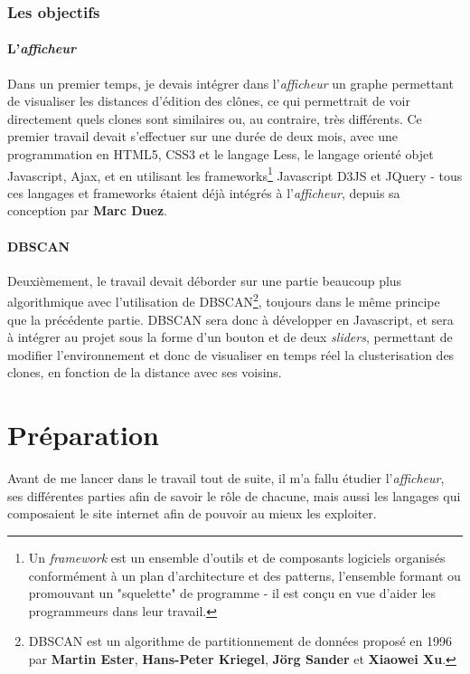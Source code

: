 \documentclass[pdftex,12pt,a4paper]{report}
\begin{document}
\begin{spacing}{1.2}
\subsection{Les objectifs}

\subsubsection{L'\textit{afficheur}}
Dans un premier temps, je devais intégrer dans l'\textit{afficheur} un graphe permettant de visualiser les distances d'édition des clônes, ce qui permettrait de voir directement quels clones sont similaires ou, au contraire, très différents.
\newline
Ce premier travail devait s'effectuer sur une durée de deux mois, avec une programmation en HTML5, CSS3 et le langage Less, le langage orienté objet Javascript, Ajax, et en utilisant les frameworks\footnote{Un \textit{framework} est un ensemble d'outils et de composants logiciels organisés conformément à un plan d'architecture et des patterns, l'ensemble formant ou promouvant un "squelette" de programme - il est conçu en vue d'aider les programmeurs dans leur travail.} Javascript D3JS et JQuery - tous ces langages et frameworks étaient déjà intégrés à l'\textit{afficheur}, depuis sa conception par \textbf{Marc Duez}.

\subsubsection{DBSCAN}
Deuxièmement, le travail devait déborder sur une partie beaucoup plus algorithmique avec l'utilisation de DBSCAN\footnote{DBSCAN est un algorithme de partitionnement de données proposé en 1996 par \textbf{Martin Ester}, \textbf{Hans-Peter Kriegel}, \textbf{Jörg Sander} et \textbf{Xiaowei Xu}.}, toujours dans le même principe que la précédente partie.
\newline
DBSCAN sera donc à développer en Javascript, et sera à intégrer au projet sous la forme d'un bouton et de deux \textit{sliders}, permettant de modifier l'environnement et donc de visualiser en temps réel la clusterisation des clones, en fonction de la distance avec ses voisins.

\chapter{Préparation}

Avant de me lancer dans le travail tout de suite, il m'a fallu étudier l'\textit{afficheur}, ses différentes parties afin de savoir le rôle de chacune, mais aussi les langages qui composaient le site internet afin de pouvoir au mieux les exploiter.


\end{spacing}
\end{document}
